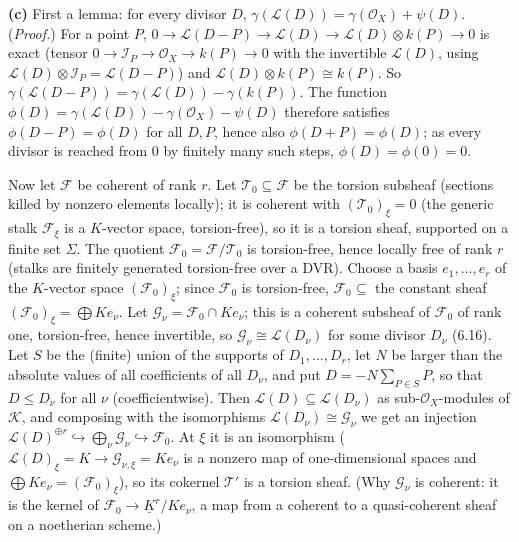 \documentclass[11pt]{article}
\begin{document}
\textbf{(c)} First a lemma: for every divisor $D$, $\gamma(\mathcal L(D))=\gamma(\mathcal O_X)+\psi(D)$. (\emph{Proof.}) For a point $P$, $0\to\mathcal L(D-P)\to\mathcal L(D)\to\mathcal L(D)\otimes k(P)\to0$ is exact (tensor $0\to\mathcal I_P\to\mathcal O_X\to k(P)\to0$ with the invertible $\mathcal L(D)$, using $\mathcal L(D)\otimes\mathcal I_P=\mathcal L(D-P)$) and $\mathcal L(D)\otimes k(P)\cong k(P)$. So $\gamma(\mathcal L(D-P))=\gamma(\mathcal L(D))-\gamma(k(P))$. The function $\phi(D)=\gamma(\mathcal L(D))-\gamma(\mathcal O_X)-\psi(D)$ therefore satisfies $\phi(D-P)=\phi(D)$ for all $D,P$, hence also $\phi(D+P)=\phi(D)$; as every divisor is reached from $0$ by finitely many such steps, $\phi(D)=\phi(0)=0$.

Now let $\mathcal F$ be coherent of rank $r$. Let $\mathcal T_0\subseteq\mathcal F$ be the torsion subsheaf (sections killed by nonzero elements locally); it is coherent with $(\mathcal T_0)_\xi=0$ (the generic stalk $\mathcal F_\xi$ is a $K$-vector space, torsion-free), so it is a torsion sheaf, supported on a finite set $\Sigma$. The quotient $\mathcal F_0=\mathcal F/\mathcal T_0$ is torsion-free, hence locally free of rank $r$ (stalks are finitely generated torsion-free over a DVR). Choose a basis $e_1,\dots,e_r$ of the $K$-vector space $(\mathcal F_0)_\xi$; since $\mathcal F_0$ is torsion-free, $\mathcal F_0\subseteq$ the constant sheaf $(\mathcal F_0)_\xi=\bigoplus Ke_\nu$. Let $\mathcal G_\nu=\mathcal F_0\cap Ke_\nu$; this is a coherent subsheaf of $\mathcal F_0$ of rank one, torsion-free, hence invertible, so $\mathcal G_\nu\cong\mathcal L(D_\nu)$ for some divisor $D_\nu$ (6.16). Let $S$ be the (finite) union of the supports of $D_1,\dots,D_r$, let $N$ be larger than the absolute values of all coefficients of all $D_\nu$, and put $D=-N\sum_{P\in S}P$, so that $D\le D_\nu$ for all $\nu$ (coefficientwise). Then $\mathcal L(D)\subseteq\mathcal L(D_\nu)$ as sub-$\mathcal O_X$-modules of $\mathcal K$, and composing with the isomorphisms $\mathcal L(D_\nu)\cong\mathcal G_\nu$ we get an injection $\mathcal L(D)^{\oplus r}\hookrightarrow\bigoplus_\nu\mathcal G_\nu\hookrightarrow\mathcal F_0$. At $\xi$ it is an isomorphism ($\mathcal L(D)_\xi=K\to\mathcal G_{\nu,\xi}=Ke_\nu$ is a nonzero map of one-dimensional spaces and $\bigoplus Ke_\nu=(\mathcal F_0)_\xi$), so its cokernel $\mathcal T'$ is a torsion sheaf. (Why $\mathcal G_\nu$ is coherent: it is the kernel of $\mathcal F_0\to\underline{K}^r/Ke_\nu$, a map from a coherent to a quasi-coherent sheaf on a noetherian scheme.)
\end{document}
